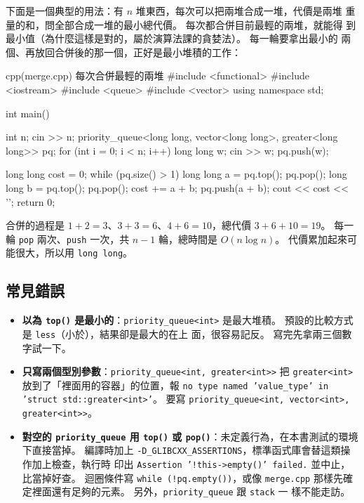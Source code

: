 下面是一個典型的用法：有 $n$ 堆東西，每次可以把兩堆合成一堆，代價是兩堆
重量的和，問全部合成一堆的最小總代價。 每次都合併目前最輕的兩堆，就能得
到最小值（為什麼這樣是對的，屬於演算法課的貪婪法）。 每一輪要拿出最小的
兩個、再放回合併後的那一個，正好是最小堆積的工作：

\begin{example}[label=ex:merge]{cpp}{(merge.cpp) 每次合併最輕的兩堆}
#include <functional>
#include <iostream>
#include <queue>
#include <vector>
using namespace std;

int main() {
    int n;
    cin >> n;
    priority_queue<long long, vector<long long>, greater<long long>> pq;
    for (int i = 0; i < n; i++) {
        long long w;
        cin >> w;
        pq.push(w);
    }

    long long cost = 0;
    while (pq.size() > 1) {
        long long a = pq.top();
        pq.pop();
        long long b = pq.top();
        pq.pop();
        cost += a + b;
        pq.push(a + b);
    }
    cout << cost << '\n';
    return 0;
}
\end{example}


合併的過程是 $1 + 2 = 3$、$3 + 3 = 6$、$4 + 6 = 10$，總代價
$3 + 6 + 10 = 19$。 每一輪 \texttt{pop} 兩次、\texttt{push} 一次，共
$n - 1$ 輪，總時間是 $O(n \log n)$。 代價累加起來可能很大，所以用
\texttt{long long}。

\subsection{常見錯誤}

\begin{itemize}
\item \textbf{以為 \texttt{top()} 是最小的}：\texttt{priority\_queue<int>}
是最大堆積。 預設的比較方式是 \texttt{less}（小於），結果卻是最大的在上
面，很容易記反。 寫完先拿兩三個數字試一下。
\item \textbf{只寫兩個型別參數}：\texttt{priority\_queue<int,
greater<int>>} 把 \texttt{greater<int>} 放到了「裡面用的容器」的位置，報
\texttt{no type named 'value\_type' in 'struct std::greater<int>'}。 要寫
\texttt{priority\_queue<int, vector<int>, greater<int>>}。
\item \textbf{對空的 \texttt{priority\_queue} 用 \texttt{top()} 或
\texttt{pop()}}：未定義行為，在本書測試的環境下直接當掉。 編譯時加上
\texttt{-D\_GLIBCXX\_ASSERTIONS}，標準函式庫會替這類操作加上檢查，執行時
印出 \texttt{Assertion '!this->empty()' failed.} 並中止，比當掉好查。
迴圈條件寫 \texttt{while (!pq.empty())}，或像 \texttt{merge.cpp} 那樣先確
定裡面還有足夠的元素。 另外，\texttt{priority\_queue} 跟 \texttt{stack} 一
樣不能走訪。
\end{itemize}

